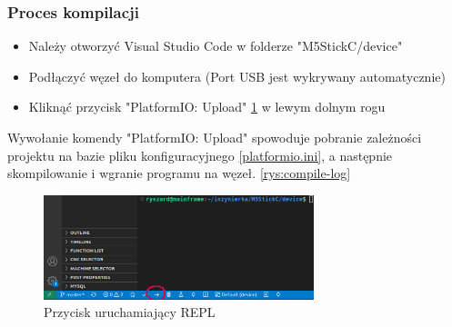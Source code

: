 \documentclass[12pt,oneside,a4paper]{book}
\theoremstyle{break}
\begin{document}
\subsubsection{Proces kompilacji}
\begin{itemize}
    \item Należy otworzyć Visual Studio Code w folderze "M5StickC/device"
    \item Podłączyć węzeł do komputera (Port USB jest wykrywany automatycznie)
    \item Kliknąć przycisk "PlatformIO: Upload" \ref{rys:vsc-upload} w lewym dolnym rogu
\end{itemize}
Wywołanie komendy "PlatformIO: Upload" spowoduje pobranie zależności projektu na bazie
pliku konfiguracyjnego \ref*{platformio.ini}, a następnie skompilowanie i wgranie
programu na węzeł. \ref{rys:compile-log}
\begin{figure}[H]
    \begin{center}
        \includegraphics[width=0.7\textwidth]{vsc-upload.png}
        \caption{Przycisk uruchamiający REPL}
        \label{rys:vsc-upload}
    \end{center}
\end{figure}
\end{document}
